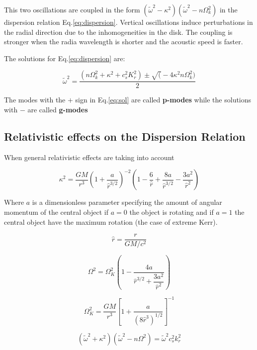 \documentclass[12pt]{article}
\begin{document}
This two oscillations are coupled in the form $(\tilde{\omega}^2 -
\kappa^2)(\tilde{\omega}^2 - n\Omega_k^2)$ in the dispersion relation
Eq.\ref{eq:dispersion}. Vertical oscillations induce perturbations
in the radial direction due to the inhomogeneities in the disk. The
coupling is stronger when the radia wavelength is shorter and the
acoustic speed is faster.

The solutions for Eq.\ref{eq:dispersion} are:

\begin{equation}\label{eq:sol}
\tilde{\omega}^2 = \dfrac{(n\Omega_k^2 + \kappa^2 + c_s^2 K_r^2) \pm
\sqrt( - 4\kappa^2n\Omega_k^2)}{2}
\end{equation}

The modes with the $+$ sign in Eq.\ref{eq:sol} are called
\textbf{p-modes} while the solutions with $-$ are called
\textbf{g-modes}

\subsection{Relativistic effects on the Dispersion Relation}

When general relativistic effects are taking into account 

\begin{equation}
\kappa^2 = \dfrac{GM}{r^3}\left( 1 + \dfrac{a}{\hat{r}^{3/2}}
\right)^{-2} \left(1 - \dfrac{6}{\hat{r}} + \dfrac{8a}{\hat{r}^{3/2}}
- \dfrac{3a^2}{\hat{r}^2}  \right)
\end{equation}

Where $a$ is a dimensionless parameter specifying the amount of
angular momentum of the central object if $a=0$ the object is rotating
and if $a=1$ the central object have the maximum rotation (the case of
extreme Kerr).

\begin{equation}
\hat{r} = \dfrac{r}{GM/c^2}
\end{equation}

\begin{equation}
\Omega_{}^2 = \Omega_{K}^2 \left(1 - \dfrac{4a}{\hat{r}^{3/2} +
\dfrac{3a^2}{\hat{r}^2}} \right)
\end{equation}

\begin{equation}
\Omega_K^2 = \dfrac{GM}{r^3} \left[ 1 + \dfrac{a}{(8
\hat{r}^3)^{1/2}}\right]^{-1}
\end{equation}

\begin{equation}
(\tilde{\omega}^2 + \kappa^2)(\tilde{\omega}^2 - n \Omega_{}^2) =
\tilde{\omega}^2 c_s^2 k_{r}^2
\end{equation}
\end{document}
